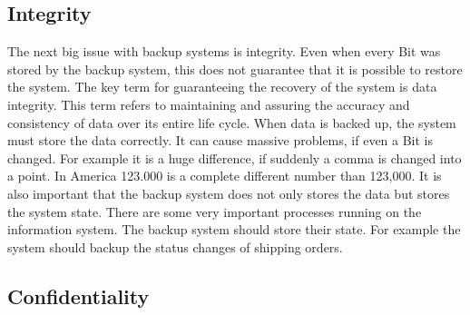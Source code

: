 \documentclass[12pt]{article}
\begin{document}
\subsection{Integrity}
The next big issue with backup systems is integrity.  Even when every Bit was stored by the backup system, this does not guarantee that it is possible to restore the system. The key term for guaranteeing the recovery of the system is data integrity\cite{WikiD}.
\newline
\newline
This term refers to maintaining and assuring the accuracy and consistency of data over its entire life cycle. When data is backed up, the system must store the data correctly. It can cause massive problems, if even a Bit is changed.  For example it is a huge difference, if suddenly a comma is changed into a point. In America 123.000 is a complete different number than 123,000.
\newline
\newline
It is also important that the backup system does not only stores the data but stores the system state. There are some very important processes running on the information system. The backup system should store their state. For example the system should backup the status changes of shipping orders.
\subsection{Confidentiality}
\end{document}

